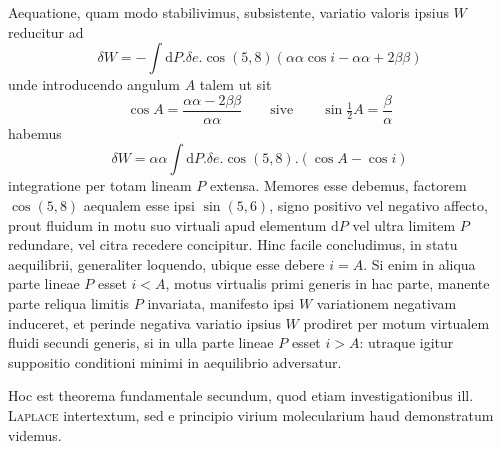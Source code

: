 Aequatione, quam modo stabilivimus, subsistente, variatio valoris ipsius $W$ reducitur ad
\[
\delta W=-\int\mathrm{d}P.\delta e.\cos(5,8)(\alpha\alpha\cos i-\alpha\alpha+2\beta\beta)
\]
unde introducendo angulum $A$ talem ut sit
\[
\cos A=\frac{\alpha\alpha-2\beta\beta}{\alpha\alpha}\qquad\text{sive}\qquad\sin\tfrac12 A=\frac\beta\alpha
\]
habemus
\[
\delta W=\alpha\alpha\int\mathrm{d}P.\delta e.\cos(5,8).(\cos A-\cos i)
\]
integratione per totam lineam $P$ extensa. Memores esse debemus, factorem $\cos(5,8)$ aequalem esse ipsi $\sin(5,6)$, signo positivo vel negativo affecto, prout fluidum in motu suo virtuali apud elementum $\mathrm{d}P$ vel ultra limitem $P$ redundare, vel citra recedere concipitur. Hinc facile concludimus, in statu aequilibrii, generaliter loquendo, ubique esse debere $i=A$. Si enim in aliqua parte lineae $P$ esset $i<A$, motus virtualis primi generis in hac parte, manente parte reliqua limitis $P$ invariata, manifesto ipsi $W$ variationem negativam induceret, et perinde negativa variatio ipsius $W$ prodiret per motum virtualem fluidi secundi generis, si in ulla parte lineae $P$ esset $i>A$: utraque igitur suppositio conditioni minimi in aequilibrio adversatur.

Hoc est theorema fundamentale secundum, quod etiam investigationibus ill. \textsc{Laplace} intertextum, sed e principio virium molecularium haud demonstratum videmus.


